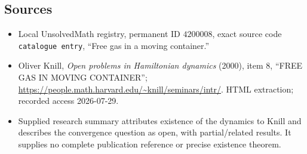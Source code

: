 \documentclass[11pt]{article}
\begin{document}
\subsection{Sources}
\begin{itemize}
\item Local UnsolvedMath registry, permanent ID \(4200008\), exact source code \texttt{catalogue entry}, ``Free gas in a moving container.''
\item Oliver Knill, \emph{Open problems in Hamiltonian dynamics} (2000), item 8, ``FREE GAS IN MOVING CONTAINER''; \url{https://people.math.harvard.edu/~knill/seminars/intr/}. HTML extraction; recorded access 2026-07-29.
\item Supplied research summary attributes existence of the dynamics to Knill and describes the convergence question as open, with partial/related results. It supplies no complete publication reference or precise existence theorem.
\end{itemize}
\end{document}
